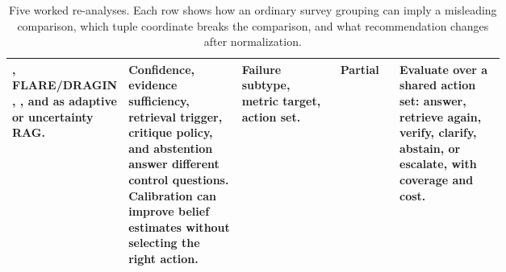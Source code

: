 \begin{table}[t]
\begin{tabularx}{\linewidth}{>{\raggedright\arraybackslash}p{0.16\linewidth}>{\raggedright\arraybackslash}p{0.23\linewidth}>{\raggedright\arraybackslash}p{0.20\linewidth}>{\raggedright\arraybackslash}p{0.12\linewidth}X}
\cite{selfRAG2023}, FLARE/DRAGIN \cite{flare2023active,venue200DRAGIN}, \cite{sufficientContext2024}, and \cite{calibRAG2025} as adaptive or uncertainty RAG. & Confidence, evidence sufficiency, retrieval trigger, critique policy, and abstention answer different control questions. Calibration can improve belief estimates without selecting the right action. & Failure subtype, metric target, action set. & Partial & Evaluate over a shared action set: answer, retrieve again, verify, clarify, abstain, or escalate, with coverage and cost. \\
\bottomrule
\end{tabularx}
\caption{Five worked re-analyses. Each row shows how an ordinary survey grouping can imply a misleading comparison, which tuple coordinate breaks the comparison, and what recommendation changes after normalization.}
\label{tab:main-worked-examples}
\end{table}

